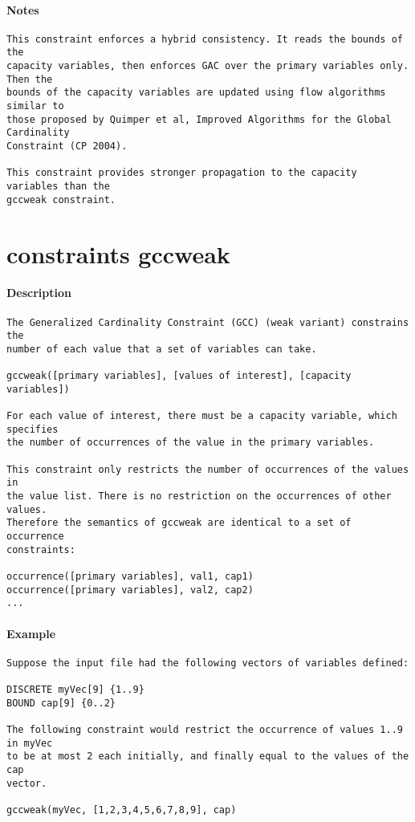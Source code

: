 \paragraph{Notes}
{\footnotesize
\begin{verbatim}
This constraint enforces a hybrid consistency. It reads the bounds of the
capacity variables, then enforces GAC over the primary variables only.  Then the
bounds of the capacity variables are updated using flow algorithms similar to
those proposed by Quimper et al, Improved Algorithms for the Global Cardinality
Constraint (CP 2004).

This constraint provides stronger propagation to the capacity variables than the
gccweak constraint.
\end{verbatim}
}
\section{constraints gccweak}
\paragraph{Description}
{\footnotesize
\begin{verbatim}
The Generalized Cardinality Constraint (GCC) (weak variant) constrains the
number of each value that a set of variables can take.

gccweak([primary variables], [values of interest], [capacity variables])

For each value of interest, there must be a capacity variable, which specifies
the number of occurrences of the value in the primary variables.

This constraint only restricts the number of occurrences of the values in
the value list. There is no restriction on the occurrences of other values.
Therefore the semantics of gccweak are identical to a set of occurrence
constraints:

occurrence([primary variables], val1, cap1)
occurrence([primary variables], val2, cap2)
...
\end{verbatim}
}
\paragraph{Example}
{\footnotesize
\begin{verbatim}
Suppose the input file had the following vectors of variables defined:

DISCRETE myVec[9] {1..9}
BOUND cap[9] {0..2}

The following constraint would restrict the occurrence of values 1..9 in myVec
to be at most 2 each initially, and finally equal to the values of the cap
vector.

gccweak(myVec, [1,2,3,4,5,6,7,8,9], cap)
\end{verbatim}
}
